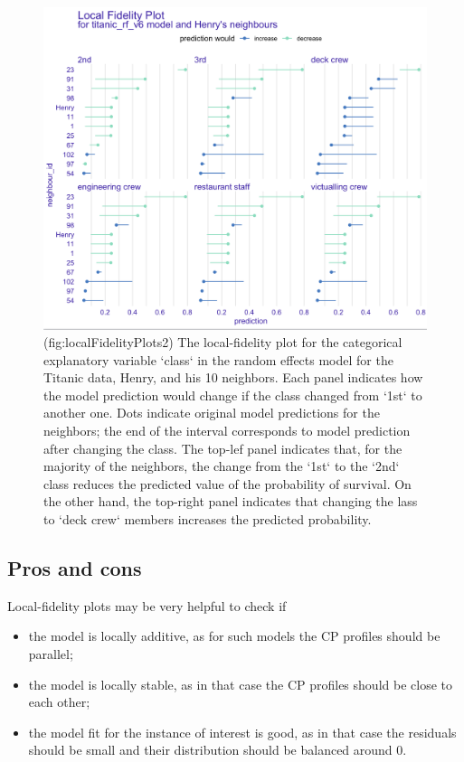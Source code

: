 \documentclass[12pt,]{krantz}
\providecommand{\tightlist}{%
  \setlength{\itemsep}{0pt}\setlength{\parskip}{0pt}}
\theoremstyle{definition}
\theoremstyle{definition}
\theoremstyle{definition}
\theoremstyle{remark}
\begin{document}
\begin{figure}

{\centering \includegraphics[width=0.7\linewidth]{figure/cp_fidelity_2} 

}

\caption{(fig:localFidelityPlots2) The local-fidelity plot for the categorical explanatory variable `class` in the random effects model for the Titanic data, Henry, and his 10 neighbors. Each panel indicates how the model prediction would change if the class changed from  `1st` to another one. Dots indicate original model predictions for the neighbors; the end of the interval corresponds to model prediction after changing the class. The top-lef panel indicates that, for the majority of the neighbors, the change from the `1st` to the `2nd` class reduces the predicted value of the probability of survival. On the other hand, the top-right panel indicates that changing the lass to `deck crew` members increases the predicted probability.}\label{fig:localFidelityPlots2}
\end{figure}

\hypertarget{cPLocDiagProsCons}{%
\subsection{Pros and cons}\label{cPLocDiagProsCons}}

Local-fidelity plots may be very helpful to check if

\begin{itemize}
\tightlist
\item
  the model is locally additive, as for such models the CP profiles
  should be parallel;
\item
  the model is locally stable, as in that case the CP profiles should be
  close to each other;
\item
  the model fit for the instance of interest is good, as in that case
  the residuals should be small and their distribution should be
  balanced around 0.
\end{itemize}
\end{document}
